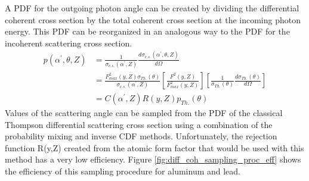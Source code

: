 A PDF for the outgoing photon angle can be created by dividing the differential
coherent cross section by the total coherent cross section at the incoming
photon energy. This PDF can be reorganized in an analogous way to the PDF for 
the incoherent scattering cross section. 
\begin{align}
  p(\alpha^{'},\theta,Z) & = \frac{1}{\sigma_{c.s.}(\alpha^{'},Z)}
  \frac{d\sigma_{c.s.}(\alpha^{'},\theta,Z)}{d\Omega} \nonumber \\
  & = \frac{F^2_{max}(y,Z) \sigma_{Th.}(\theta)}{\sigma_{c.s.}(\alpha^{'},Z)}
  \left[\frac{F^2(y,Z)}{F^2_{max}(y,Z)}\right]
  \left[\frac{1}{\sigma_{Th.}(\theta)} \frac{d\sigma_{Th.}(\theta)}{d\Omega}
  \right] \nonumber \\
  & = C(\alpha^{'},Z)R(y,Z)p_{Th.}(\theta) \nonumber
\end{align}
Values of the scattering angle can be sampled from the PDF of the classical 
Thompson differential scattering cross section using a combination of the 
probability mixing and inverse CDF methods. Unfortunately, the rejection
function R(y,Z) created from the atomic form factor that would be used with this
method has a very low efficiency. Figure \ref{fig:diff_coh_sampling_proc_eff} 
shows the efficiency of this sampling procedure for aluminum and lead. 

